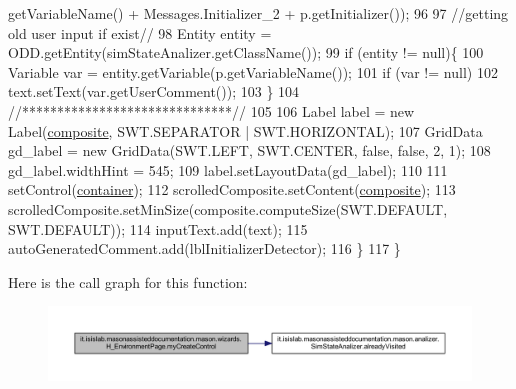 \begin{DoxyCode}
      getVariableName() + Messages.Initializer\_2 + p.getInitializer());
96             
97             \textcolor{comment}{//getting old user input if exist//}
98             Entity entity = ODD.getEntity(simStateAnalizer.getClassName());
99             \textcolor{keywordflow}{if} (entity != null)\{
100                 Variable var = entity.getVariable(p.getVariableName());
101                 \textcolor{keywordflow}{if} (var != null)
102                     text.setText(var.getUserComment());
103             \}
104             \textcolor{comment}{//******************************//}
105             
106             Label label = \textcolor{keyword}{new} Label(\hyperlink{classit_1_1isislab_1_1masonassisteddocumentation_1_1mason_1_1wizards_1_1_h___environment_page_a08701d3343b8c6232831af0077e6cb37}{composite}, SWT.SEPARATOR | SWT.HORIZONTAL);
107             GridData gd\_label = \textcolor{keyword}{new} GridData(SWT.LEFT, SWT.CENTER, \textcolor{keyword}{false}, \textcolor{keyword}{false}, 2, 1);
108             gd\_label.widthHint = 545;
109             label.setLayoutData(gd\_label);
110             
111             setControl(\hyperlink{classit_1_1isislab_1_1masonassisteddocumentation_1_1mason_1_1wizards_1_1_h___environment_page_a77ebe828c5c45ce8b60db94f30d94203}{container});
112             scrolledComposite.setContent(\hyperlink{classit_1_1isislab_1_1masonassisteddocumentation_1_1mason_1_1wizards_1_1_h___environment_page_a08701d3343b8c6232831af0077e6cb37}{composite});
113             scrolledComposite.setMinSize(composite.computeSize(SWT.DEFAULT, SWT.DEFAULT));  
114             inputText.add(text);
115             autoGeneratedComment.add(lblInitializerDetector);
116         \}
117     \}
\end{DoxyCode}


Here is the call graph for this function\-:\nopagebreak
\begin{figure}[H]
\begin{center}
\leavevmode
\includegraphics[width=350pt]{classit_1_1isislab_1_1masonassisteddocumentation_1_1mason_1_1wizards_1_1_h___environment_page_a99746d862f89a4dad13af734914642cf_cgraph}
\end{center}
\end{figure}




